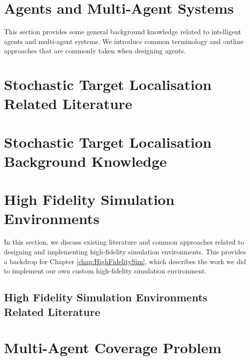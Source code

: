 \section{Agents and Multi-Agent Systems}
This section provides some general background knowledge related to intelligent agents and multi-agent systems. We introduce common terminology and outline approaches that are commonly taken when designing agents.


\section{Stochastic Target Localisation Related Literature}\label{sec:StochasticTargetLocalisationRelatedLiterature}


\section{Stochastic Target Localisation Background Knowledge}\label{sec:StochasticTargetLocalizationBackground}


\section{High Fidelity Simulation Environments}
In this section, we discuss existing literature and common approaches related to designing and implementing high-fidelity simulation environments. This provides a backdrop for Chapter \ref{chap:HighFidelitySim}, which describes the work we did to implement our own custom high-fidelity simulation environment.
\subsection{High Fidelity Simulation Environments Related Literature}\label{sec:SimulationEnvironmentsRelatedLiterature}



\section{Multi-Agent Coverage Problem}




